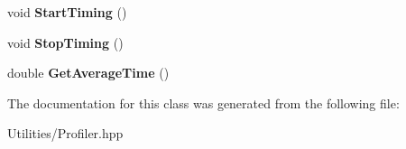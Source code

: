 \begin{DoxyCompactItemize}
\item 
\hypertarget{classtools_1_1_profiled_function_a769ad7f606d86a3fe5aa314c8f0e7507}{void {\bfseries Start\+Timing} ()}\label{classtools_1_1_profiled_function_a769ad7f606d86a3fe5aa314c8f0e7507}

\item 
\hypertarget{classtools_1_1_profiled_function_ad63c5b2301953bccea9fb2e57ace99cd}{void {\bfseries Stop\+Timing} ()}\label{classtools_1_1_profiled_function_ad63c5b2301953bccea9fb2e57ace99cd}

\item 
\hypertarget{classtools_1_1_profiled_function_ad6467dbe52289e6d40d767fa9db04378}{double {\bfseries Get\+Average\+Time} ()}\label{classtools_1_1_profiled_function_ad6467dbe52289e6d40d767fa9db04378}

\end{DoxyCompactItemize}


The documentation for this class was generated from the following file\+:\begin{DoxyCompactItemize}
\item 
Utilities/Profiler.\+hpp\end{DoxyCompactItemize}
